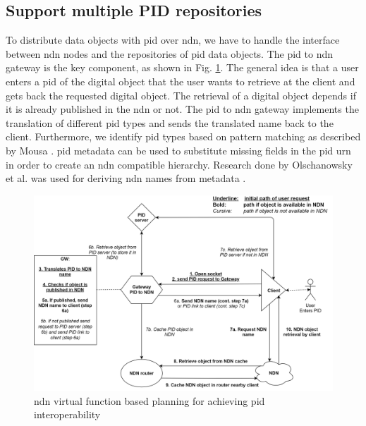 \documentclass[conference]{IEEEtran}
\begin{document}
\subsection{Support multiple PID repositories}
To distribute data objects with \gls{pid} over \gls{ndn}, we have to handle the interface between \gls{ndn} nodes and the repositories of \gls{pid} data objects. The \gls{pid} to \gls{ndn} gateway is the key component, as shown in Fig. \ref{fig:sdc_model}. The general idea is that a user enters a \gls{pid} of the digital object that the user wants to retrieve at the client and gets back the requested digital object. The retrieval of a digital object depends if it is already published in the \gls{ndn} or not. The \gls{pid} to \gls{ndn} gateway implements the translation of different \gls{pid} types and sends the translated name back to the client. Furthermore, we identify \gls{pid} types based on pattern matching as described by Mousa \cite{ndn-app-aware}. \gls{pid} metadata can be used to substitute missing fields in the \gls{pid} \gls{urn} in order to create an \gls{ndn} compatible hierarchy. Research done by Olschanowsky et al. was used for deriving \gls{ndn} names from metadata \cite{ndn-man}.


\begin{figure}[H]
\centering
\includegraphics[width=\columnwidth]{images/PIDtoNDN.png}
\caption{\gls{ndn} virtual function based planning for achieving \gls{pid} interoperability}
\label{fig:sdc_model}
\end{figure}
\end{document}
